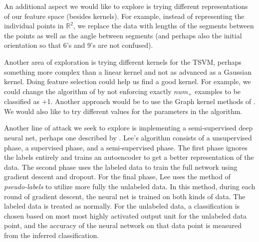 \documentclass[11pt]{article}
\begin{document}
An additional aspect we would like to explore is trying different representations of our feature space (besides kernels). For example, instead of representing the individual points in $\mathbb R^2$, we replace the data with lengths of the segments between the points as well as the angle between segments (and perhaps also the initial orientation so that 6's and 9's are not confused).

Another area of exploration is trying different kernels for the TSVM, perhaps something more complex than a linear kernel and not as advanced as a Gaussian kernel. Doing feature selection could help us find a good kernel. For example, we could change the algorithm of \cite{Joachims:1999} by not enforcing exactly $num_+$ examples to be classified as +1. Another approach would be to use the Graph kernel methods of \cite{smola2003kernels}. We would also like to try different values for the parameters in the algorithm.

Another line of attack we seek to explore is implementing a semi-supervised deep neural net, perhaps one described by \cite{Lee:2013}. Lee's algorithm consists of a unsupervised phase, a supervised phase, and a semi-supervised phase. The first phase ignores the labels entirely and trains an autoencoder to get a better representation of the data. The second phase uses the labeled data to train the full network using gradient descent and dropout. For the final phase, Lee uses the method of \emph{pseudo-labels} to utilize more fully the unlabeled data. In this method, during each round of gradient descent, the neural net is trained on both kinds of data. The labeled data is treated as normally. For the unlabeled data, a classification is chosen based on most most highly activated output unit for the unlabeled data point, and the accuracy of the neural network on that data point is measured from the inferred classification.



\end{document}
